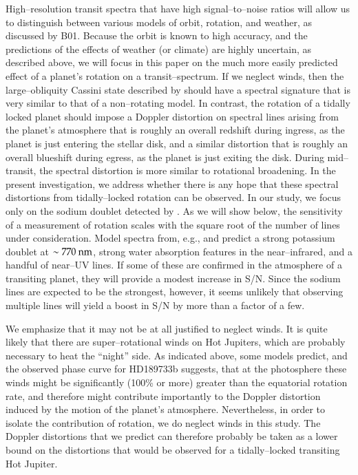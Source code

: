 High--resolution transit spectra that have high signal--to--noise
ratios will allow us to distinguish between various models of orbit,
rotation, and weather, as discussed by B01.  Because the orbit is
known to high accuracy, and the predictions of the effects of weather
(or climate) are highly uncertain, as described above, we will focus
in this paper on the much more easily predicted effect of a planet's
rotation on a transit--spectrum.  If we neglect winds, then the
large--obliquity Cassini state described by \citet{winn+holman2005}
should have a spectral signature that is very similar to that of a
non--rotating model.  In contrast, the rotation of a tidally locked
planet should impose a Doppler distortion on spectral lines arising
from the planet's atmosphere that is roughly an overall redshift
during ingress, as the planet is just entering the stellar disk, and a
similar distortion that is roughly an overall blueshift during egress,
as the planet is just exiting the disk.  During mid--transit, the
spectral distortion is more similar to rotational broadening.  In the
present investigation, we address whether there is any hope that these
spectral distortions from tidally--locked rotation can be observed.
In our study, we focus only on the sodium doublet detected by
\citet{charbonneau_et_al2002}.  As we will show below, the sensitivity
of a measurement of rotation scales with the square root of the number
of lines under consideration.  Model spectra from, e.g.,
\citet{sudarsky_et_al2003} and \citet{barman2007} predict a strong
potassium doublet at $\sim 770 {\rm~nm}$, strong water absorption
features in the near--infrared, and a handful of near--UV lines.  If
some of these are confirmed in the atmosphere of a transiting planet,
they will provide a modest increase in S/N.  Since the sodium lines
are expected to be the strongest, however, it seems unlikely that
observing multiple lines will yield a boost in S/N by more than a
factor of a few.

We emphasize that it may not be at all justified to neglect winds.  It
is quite likely that there are super--rotational winds on Hot
Jupiters, which are probably necessary to heat the ``night'' side.  As
indicated above, some models predict, and the observed phase curve for
HD189733b suggests, that at the photosphere these winds might be
significantly (100\% or more) greater than the equatorial rotation
rate, and therefore might contribute importantly to the Doppler
distortion induced by the motion of the planet's atmosphere.
Nevertheless, in order to isolate the contribution of rotation, we do
neglect winds in this study.  The Doppler distortions that we predict
can therefore probably be taken as a lower bound on the distortions
that would be observed for a tidally--locked transiting Hot Jupiter.

